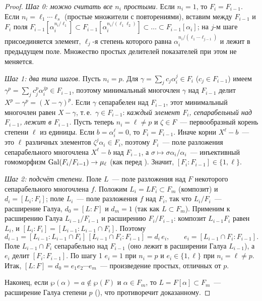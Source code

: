 \begin{proof}
\emph{Шаг 0: можно считать все $n_i$ простыми.} Если $n_i=1$, то $F_i=F_{i-1}$. Если $n_i=\ell_1\cdots\ell_s$ (простые
множители с повторениями), вставим между $F_{i-1}$ и $F_i$ поля
$F_{i-1}[\alpha_i^{n_i/\ell_1}]\subset F_{i-1}[\alpha_i^{n_i/(\ell_1\ell_2)}]\subset\dots\subset F_{i-1}[\alpha_i]$; на $j$-м шаге
присоединяется элемент, $\ell_j$-я степень которого равна $\alpha_i^{n_i/(\ell_1\cdots\ell_{j-1})}$ и лежит в предыдущем поле.
Множество простых делителей показателей при этом не меняется.

\emph{Шаг 1: два типа шагов.} Пусть $n_i=p$. Для $\gamma=\sum_jc_j\alpha_i^j\in F_i$ ($c_j\in F_{i-1}$) имеем
$\gamma^p=\sum_jc_j^p\alpha_i^{jp}\in F_{i-1}$, поэтому минимальный многочлен $\gamma$ над $F_{i-1}$ делит
$X^p-\gamma^p=(X-\gamma)^p$. Если $\gamma$ сепарабелен над $F_{i-1}$, этот минимальный многочлен равен $X-\gamma$, т.\,е.\
$\gamma\in F_{i-1}$: \emph{каждый элемент $F_i$, сепарабельный над $F_{i-1}$, лежит в $F_{i-1}$.} Пусть теперь $n_i=\ell\ne p$
и $\zeta\in F$~--- первообразный корень степени $\ell$ из единицы. Если $b=\alpha_i^\ell=0$, то $F_i=F_{i-1}$. Иначе корни
$X^\ell-b$~--- это $\ell$ различных элементов $\zeta^j\alpha_i\in F_i$, поэтому $F_i$~--- поле разложения сепарабельного
многочлена $X^\ell-b$ над $F_{i-1}$, а $\sigma\mapsto\sigma\alpha_i/\alpha_i$~--- инъективный гомоморфизм
$\operatorname{Gal}(F_i/F_{i-1})\to\mu_\ell$ (как перед \rf{5.27}). Значит, $[F_i:F_{i-1}]\in\{1,\ell\}$.

\emph{Шаг 2: подсчёт степени.} Поле $L$~--- поле разложения над $F$ некоторого сепарабельного многочлена $f$. Положим
$L_i=LF_i\subset F_m$ (композит) и $d_i=[L_i:F_i]$; поле $L_i$~--- поле разложения $f$ над $F_i$, так что $L_i/F_i$~---
расширение Галуа, $d_0=[L:F]$ и $d_m=1$ (так как $L\subset F_m$). Применим \rf{3.19} к расширению Галуа $L_{i-1}/F_{i-1}$ и
расширению $F_i/F_{i-1}$: композит $L_{i-1}F_i$ равен $L_i$, и $[L_i:F_i]=[L_{i-1}:L_{i-1}\cap F_i]$. Поэтому
\[
d_{i-1}=[L_{i-1}:L_{i-1}\cap F_i]\,[L_{i-1}\cap F_i:F_{i-1}]=d_i\,e_i,\qquad e_i=[L_{i-1}\cap F_i:F_{i-1}].
\]
Поле $L_{i-1}\cap F_i$ сепарабельно над $F_{i-1}$ (оно лежит в расширении Галуа $L_{i-1}$), а $e_i$ делит $[F_i:F_{i-1}]$.
По шагу 1 $e_i=1$ при $n_i=p$ и $e_i\in\{1,\ell\}$ при $n_i=\ell\ne p$. Итак, $[L:F]=d_0=e_1e_2\cdots e_m$~--- произведение
простых, отличных от $p$.

Наконец, если $\wp(\alpha)=a\notin\wp(F)$ и $\alpha\in F_m$, то $L=F[\alpha]\subset F_m$~--- расширение Галуа степени $p$
(\rf{5.32c}), что противоречит доказанному.
\end{proof}

